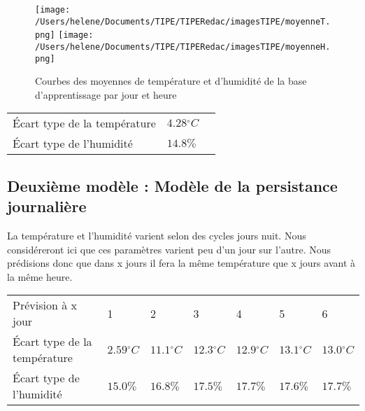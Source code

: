 \documentclass[11pt,a4paper]{article}
\begin{document}
\begin{figure} [!h]
\centering
\texttt{[image: /Users/helene/Documents/TIPE/TIPERedac/imagesTIPE/moyenneT.png]}\quad
\texttt{[image: /Users/helene/Documents/TIPE/TIPERedac/imagesTIPE/moyenneH.png]}
\caption{\label{fig:190101Lolita} Courbes des moyennes de température et d'humidité de la base d'apprentissage par jour et heure}
\end{figure}

\begin{tabular}{lll}\hline
\hline
Écart type de la température& $4.28{}^{\circ}C$\\
Écart type de l'humidité       &  $ 14.8\% $\\
\hline 
\end{tabular}


\subsection{Deuxième modèle : Modèle de la persistance journalière}
 La température et l'humidité varient selon des cycles jours nuit. Nous considéreront ici que ces paramètres varient peu d'un jour sur l'autre. Nous prédisions donc que dans x jours il fera la même température que x jours avant à la même heure.
\begin{tabular}{lllllll}\hline
\hline
Prévision à x jour                  &1                         &2                         &3                           &4                         &5                          &6 \\
Écart type de la température& $2.59{}^{\circ}C$& $11.1{}^{\circ}C$& $12.3{}^{\circ}C$& $12.9{}^{\circ}C$& $13.1{}^{\circ}C$& $13.0{}^{\circ}C$\\
Écart type de l'humidité       &  $ 15.0\% $         &  $ 16.8\% $         &  $ 17.5\% $        &  $ 17.7\% $         &  $ 17.6\% $         &  $ 17.7\% $\\
\hline 
\end{tabular}

\end{document}
